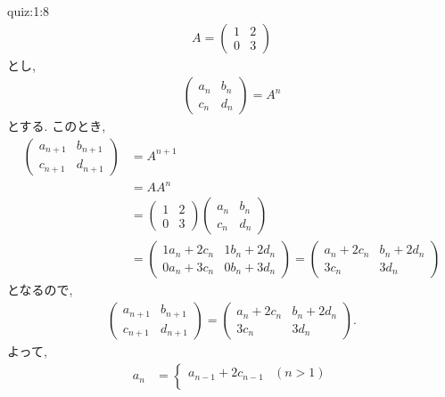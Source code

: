 \begin{answerof}{quiz:1:8}
  \begin{align*}
    A=
    \begin{pmatrix}
      1&2\\0&3
    \end{pmatrix}
  \end{align*}
  とし,
  \begin{align*}
    \begin{pmatrix}
      a_n&b_n\\c_n&d_n
    \end{pmatrix}
    =A^n
  \end{align*}
  とする.
  このとき,
  \begin{align*}
    \begin{pmatrix}
      a_{n+1}&b_{n+1}\\c_{n+1}&d_{n+1}
    \end{pmatrix}
    &=A^{n+1}\\
    &=AA^{n}\\
    &=
    \begin{pmatrix}
      1&2\\0&3
    \end{pmatrix}
    \begin{pmatrix}
      a_n&b_n\\c_n&d_n
    \end{pmatrix}\\
    &=
    \begin{pmatrix}
      1a_n+2c_n&1b_n+2d_n\\0a_n+3c_n&0b_n+3d_n
    \end{pmatrix}
    =
    \begin{pmatrix}
      a_n+2c_n&b_n+2d_n\\3c_n&3d_n
    \end{pmatrix}
  \end{align*}
  となるので,
  \begin{align*}
    \begin{pmatrix}
      a_{n+1}&b_{n+1}\\c_{n+1}&d_{n+1}
    \end{pmatrix}
    =
    \begin{pmatrix}
      a_n+2c_n&b_n+2d_n\\3c_n&3d_n
    \end{pmatrix}.
  \end{align*}
  よって,
  \begin{align*}
    a_n&=
    \begin{cases}
      a_{n-1}+2c_{n-1} &(n>1)\\

\end{cases}
\end{align*}
\end{answerof}
